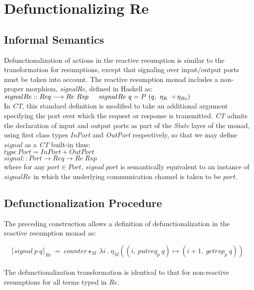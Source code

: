 \documentclass{article}
\begin{document}
\section{Defunctionalizing Re}

\subsection{Informal Semantics}

Defunctionalization of actions in the reactive resumption is similar to the transformation for resumptions,
except that signaling over input/output ports must be taken into account.  The reactive resumption monad includes a non-proper morphism, \textit{signalRe}, defined in Haskell as:\\

$signalRe :: Req \longrightarrow Re \ Rsp\\
\indent signalRe \ q = P \ (q, \ \eta_{K} \ \circ \eta_{Re})$\\

\noindent In \textit{CT}, this standard definition is modified to take an additional argument specifying the port over which the request or response is transmitted.  \textit{CT} admits the declaration of input and output ports as part of the \textit{State} layer of the monad, using first class types \textit{InPort} and \textit{OutPort} respectively, so that we may define $signal$ as a \textit{CT} built-in thus:\\

$type \ Port = InPort + OutPort$\\
\indent$signal :: Port \longrightarrow Req \longrightarrow Re \ Rsp$\\

\noindent where for any $port \in Port$, $signal \ port$ is semantically equivalent to an instance of $signalRe$ in which the underlying communication channel is taken to be $port$.

\subsection{Defunctionalization Procedure}

The preceding construction allows a definition of defunctionalization in the reactive resumption monad as:

\begin{equation}
{
\lceil signal \ p \ q \rceil_{Re} \ = \ counter \star_{M} \ \lambda i \ . \ \eta_{M} ((i, \ putreq_{p} \ q) \mapsto (i + 1, \ getrsp_{p} \ q))
}
\end{equation}
\\
The defunctionalization transformation is identical to that for non-reactive resumptions for all terms typed in $Re$.\\
\end{document}

